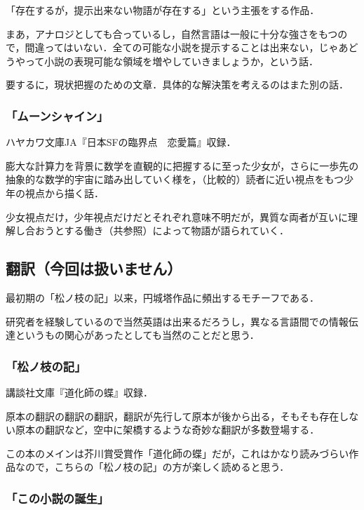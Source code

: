\documentclass[10pt, a5paper, twoside]{jsarticle}
\theoremstyle{definition}
\begin{document}
				「存在するが，提示出来ない物語が存在する」という主張をする作品．

				まあ，アナロジとしても合っているし，自然言語は一般に十分な強さをもつので，間違ってはいない．全ての可能な小説を提示することは出来ない，じゃあどうやって小説の表現可能な領域を増やしていきましょうか，という話．

				要するに，現状把握のための文章．具体的な解決策を考えるのはまた別の話．

			\subsubsection{「ムーンシャイン」}

				ハヤカワ文庫JA『日本SFの臨界点　恋愛篇』収録．

				膨大な計算力を背景に数学を直観的に把握するに至った少女が，さらに一歩先の抽象的な数学的宇宙に踏み出していく様を，（比較的）読者に近い視点をもつ少年の視点から描く話．

				少女視点だけ，少年視点だけだとそれぞれ意味不明だが，異質な両者が互いに理解し合おうとする働き（共参照）によって物語が語られていく．

		\subsection{翻訳（今回は扱いません）}

			最初期の「松ノ枝の記」以来，円城塔作品に頻出するモチーフである．

			研究者を経験しているので当然英語は出来るだろうし，異なる言語間での情報伝達というもの関心があったとしても当然のことだと思う．

			\subsubsection{「松ノ枝の記」}

				講談社文庫『道化師の蝶』収録．

				原本の翻訳の翻訳の翻訳，翻訳が先行して原本が後から出る，そもそも存在しない原本の翻訳など，空中に架橋するような奇妙な翻訳が多数登場する．

				この本のメインは芥川賞受賞作「道化師の蝶」だが，これはかなり読みづらい作品なので，こちらの「松ノ枝の記」の方が楽しく読めると思う．

			\subsubsection{「この小説の誕生」}
				
\end{document}
